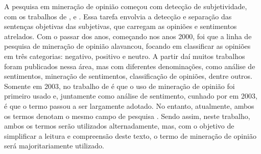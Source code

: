 %
%
%
%

A pesquisa em mineração de opinião começou com detecção de subjetividade, com os trabalhos de \cite{carbonell1979subjective}, \cite{wilks1983beliefs} e \cite{wilson2004just}. Essa tarefa envolvia a detecção e separação das sentenças objetivas das subjetivas, que carregam as opiniões e sentimentos atrelados. Com o passar dos anos, começando nos anos 2000, foi que a linha de pesquisa de mineração de opinião alavancou, focando em classificar as opiniões em três categorias: negativo, positivo e neutro. A partir daí muitos trabalhos foram publicados nessa área, mas com diferentes denominações, como análise de sentimentos, mineração de sentimentos, classificação de opiniões, dentre outros. Somente em 2003, no trabalho de \cite{dave2003mining} é que o uso de mineração de opinião foi primeiro usado e, juntamente como análise de sentimento, cunhado por \cite{nasukawa2003sentiment} em 2003, é que o termo passou a ser largamente adotado. No entanto, atualmente, ambos os termos denotam o mesmo campo de pesquisa \cite{bing:2012, pang:2008}. Sendo assim, neste trabalho, ambos os termos serão utilizados alternadamente, mas, com o objetivo de simplificar a leitura e compreensão deste texto, o termo de mineração de opinião será majoritariamente utilizado.

